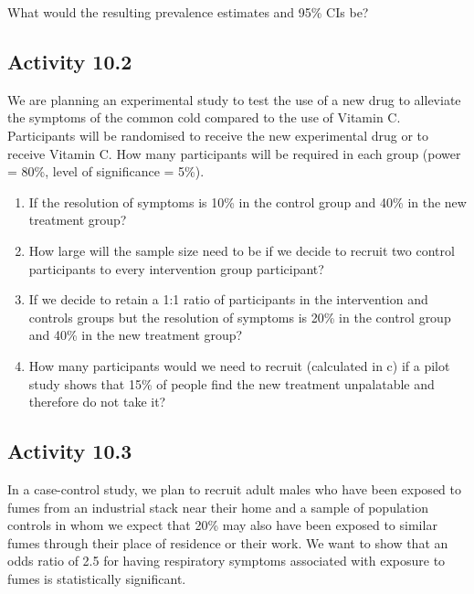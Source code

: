 \documentclass[
]{memoir}
\providecommand{\tightlist}{%
  \setlength{\itemsep}{0pt}\setlength{\parskip}{0pt}}
\begin{document}
What would the resulting prevalence estimates and 95\% CIs be?

\hypertarget{activity-10.2}{%
\subsection*{Activity 10.2}\label{activity-10.2}}

We are planning an experimental study to test the use of a new drug to alleviate the symptoms of the common cold compared to the use of Vitamin C. Participants will be randomised to receive the new experimental drug or to receive Vitamin C. How many participants will be required in each group (power = 80\%, level of significance = 5\%).

\begin{enumerate}
\def\labelenumi{\alph{enumi})}
\tightlist
\item
  If the resolution of symptoms is 10\% in the control group and 40\% in the new treatment group?
\item
  How large will the sample size need to be if we decide to recruit two control participants to every intervention group participant?
\item
  If we decide to retain a 1:1 ratio of participants in the intervention and controls groups but the resolution of symptoms is 20\% in the control group and 40\% in the new treatment group?
\item
  How many participants would we need to recruit (calculated in c) if a pilot study shows that 15\% of people find the new treatment unpalatable and therefore do not take it?
\end{enumerate}

\hypertarget{activity-10.3}{%
\subsection*{Activity 10.3}\label{activity-10.3}}

In a case-control study, we plan to recruit adult males who have been exposed to fumes from an industrial stack near their home and a sample of population controls in whom we expect that 20\% may also have been exposed to similar fumes through their place of residence or their work.
We want to show that an odds ratio of 2.5 for having respiratory symptoms associated with exposure to fumes is statistically significant.
\end{document}
